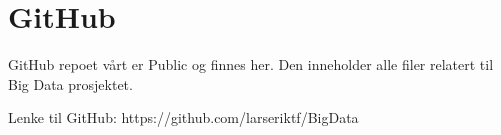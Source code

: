 \section{GitHub}
GitHub repoet vårt er Public og finnes her. Den inneholder alle filer relatert til Big Data prosjektet.

Lenke til GitHub: https://github.com/larseriktf/BigData
